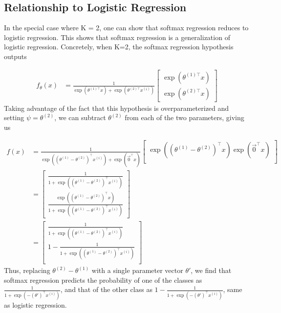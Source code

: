 \subsection{Relationship to Logistic Regression}

In the special case where K = 2, one can show that softmax regression reduces to logistic regression. This shows that softmax regression is a generalization of logistic regression. Concretely, when K=2, the softmax regression hypothesis outputs

\begin{align} 
	f_\theta(x) &= \frac{1}{ \exp(\theta^{(1)\top}x) + \exp( \theta^{(2)\top} x^{(i)} ) } \begin{bmatrix} \exp( \theta^{(1)\top} x ) \\ \exp( \theta^{(2)\top} x ) \end{bmatrix} 
\end{align}
Taking advantage of the fact that this hypothesis is overparameterized and setting $\psi = \theta^{(2)}$, we can subtract $\theta^{(2)}$ from each of the two parameters, giving us

\begin{align} f(x) &= \frac{1}{ \exp( (\theta^{(1)}-\theta^{(2)})^\top x^{(i)} ) + \exp(\vec{0}^\top x) } \begin{bmatrix} \exp( (\theta^{(1)}-\theta^{(2)})^\top x ) \exp( \vec{0}^\top x ) \\ \end{bmatrix} \\ &= \begin{bmatrix} \frac{1}{ 1 + \exp( (\theta^{(1)}-\theta^{(2)})^\top x^{(i)} ) } \\ \frac{\exp( (\theta^{(1)}-\theta^{(2)})^\top x )}{ 1 + \exp( (\theta^{(1)}-\theta^{(2)})^\top x^{(i)} ) } \end{bmatrix} \\ &= \begin{bmatrix} \frac{1}{ 1 + \exp( (\theta^{(1)}-\theta^{(2)})^\top x^{(i)} ) } \\ 1 - \frac{1}{ 1 + \exp( (\theta^{(1)}-\theta^{(2)})^\top x^{(i)} ) } \\ \end{bmatrix} 
\end{align}
Thus, replacing $\theta^{(2)}-\theta^{(1)}$ with a single parameter vector $\theta'$, we find that softmax regression predicts the probability of one of the classes as $\frac{1}{ 1 + \exp(- (\theta')^\top x^{(i)} ) }$, and that of the other class as $1 - \frac{1}{ 1 + \exp(- (\theta')^\top x^{(i)} ) }$, same as logistic regression.



